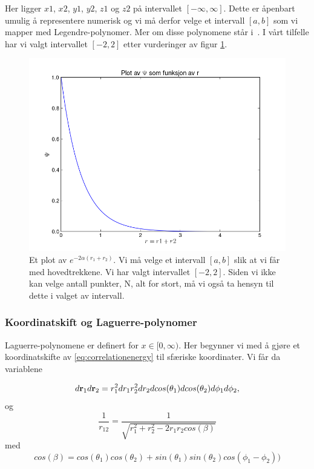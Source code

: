 \documentclass[11pt]{article}
\begin{document}
Her ligger $x1$, $x2$, $y1$, $y2$, $z1$ og $z2$ på intervallet 
$[-\infty, \infty]$. Dette er åpenbart umulig å representere numerisk
og vi må derfor velge et intervall $[a,b]$ som vi mapper med Legendre-polynomer.
Mer om disse polynomene står i~\cite{Lecture-notes}. I vårt tilfelle
har vi valgt intervallet $[-2,2]$ etter vurderinger av figur \ref{fig:PSI}.

\begin{figure}[ht]
  \centering
  \includegraphics[scale=0.7]{../fig/psiPlot.png}
  \caption{\label{fig:PSI} Et plot av  $e^{-2\alpha (r_1+r_2)}$. Vi må velge
et intervall $[a,b]$ slik at vi får med hovedtrekkene. Vi har valgt 
intervallet $[-2,2]$. Siden vi ikke kan velge antall punkter, N,
alt for stort, må vi også ta hensyn til dette i valget av intervall.}
\end{figure}


\subsubsection{Koordinatskift og Laguerre-polynomer}
\label{susubsec:gauss-laguerre}
Laguerre-polynomene er definert for $x\in[0,\infty)$. Her begynner vi med å gjøre et koordinatskifte av 
\eqref{eq:correlationenergy} til sfæriske koordinater. Vi får da variablene

\[
   d{\bf r}_1d{\bf r}_2  = r_1^2dr_1 r_2^2dr_2 dcos(\theta_1)dcos(\theta_2)d\phi_1d\phi_2,
\]
og
\[
   \frac{1}{r_{12}}= \frac{1}{\sqrt{r_1^2+r_2^2-2r_1r_2cos(\beta)}}
\]
med 
\[
cos(\beta) = cos(\theta_1)cos(\theta_2)+sin(\theta_1)sin(\theta_2)cos(\phi_1-\phi_2))
\]
\end{document}
